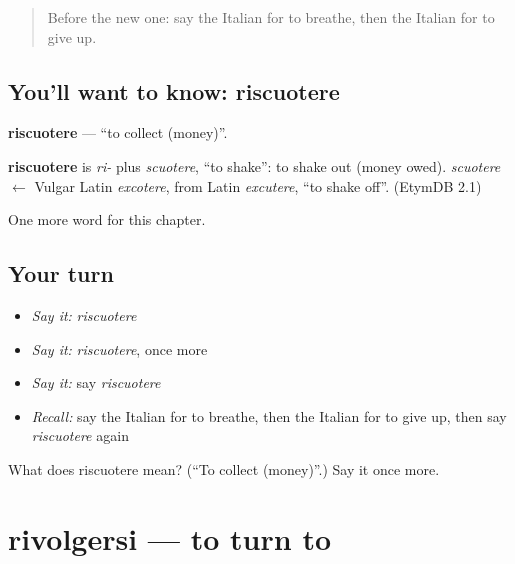 \label{lesson:IT-C242-riscuotere}



\begin{quote}
Before the new one: say the Italian for to breathe, then the Italian for to give up.
\end{quote}

\subsection*{You'll want to know: riscuotere}
\textbf{riscuotere} — \textquotedblleft{}to collect (money)\textquotedblright{}.

\begin{cousinweb}
\textbf{riscuotere} is \emph{ri-} plus \emph{scuotere}, \textquotedblleft{}to shake\textquotedblright{}: to shake out (money owed). \emph{scuotere} $\leftarrow$ Vulgar Latin \emph{excotere}, from Latin \emph{excutere}, \textquotedblleft{}to shake off\textquotedblright{}. (EtymDB 2.1)
\end{cousinweb}

\begin{grammarlens}[title={What you've built}]
One more word for this chapter.
\end{grammarlens}

\subsection*{Your turn}
\begin{itemize}
\raggedright
  \item \emph{Say it:} \emph{riscuotere}
  \item \emph{Say it:} \emph{riscuotere}, once more
  \item \emph{Say it:} say \emph{riscuotere}
  \item \emph{Recall:} say the Italian for to breathe, then the Italian for to give up, then say \emph{riscuotere} again
\end{itemize}

\begin{tcolorbox}[breakable,colback=teal!4,colframe=teal!35!black,title={Before you move on}]
What does riscuotere mean? (\textquotedblleft{}To collect (money)\textquotedblright{}.) Say it once more.
\end{tcolorbox}
\section[rivolgersi]{rivolgersi — to turn to}

